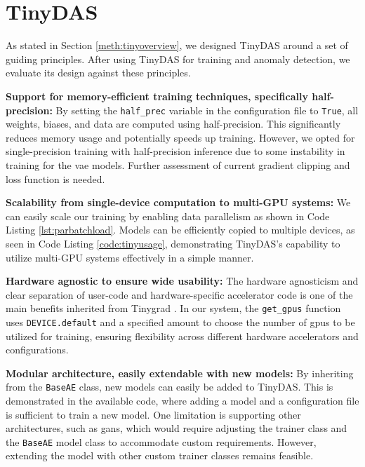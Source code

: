 \section{TinyDAS}
\label{disc:tinydas}

As stated in Section \ref{meth:tinyoverview}, we designed TinyDAS around a set of guiding principles. After using TinyDAS for training and anomaly detection, we evaluate its design against these principles.

\textbf{Support for memory-efficient training techniques, specifically half-precision:}
By setting the \lstinline|half_prec| variable in the configuration file to \lstinline|True|, all weights, biases, and data are computed using half-precision. This significantly reduces memory usage and potentially speeds up training. However, we opted for single-precision training with half-precision inference due to some instability in training for the \acrshort{vae} models. Further assessment of current gradient clipping and loss function is needed.

\textbf{Scalability from single-device computation to multi-GPU systems:}
We can easily scale our training by enabling data parallelism as shown in Code Listing \ref{lst:parbatchload}. Models can be efficiently copied to multiple devices, as seen in Code Listing \ref{code:tinyusage}, demonstrating TinyDAS's capability to utilize multi-GPU systems effectively in a simple manner.

\textbf{Hardware agnostic to ensure wide usability:}
The hardware agnosticism and clear separation of user-code and hardware-specific accelerator code is one of the main benefits inherited from Tinygrad \cite{tinygrad}. In our system, the \lstinline|get_gpus| function uses \lstinline|DEVICE.default| and a specified amount to choose the number of \acrshort{gpu}s to be utilized for training, ensuring flexibility across different hardware accelerators and configurations.

\textbf{Modular architecture, easily extendable with new models:}
By inheriting from the \lstinline|BaseAE| class, new models can easily be added to TinyDAS. This is demonstrated in the available code, where adding a model and a configuration file is sufficient to train a new model. One limitation is supporting other architectures, such as \acrshort{gan}s, which would require adjusting the trainer class and the \lstinline|BaseAE| model class to accommodate custom requirements. However, extending the model with other custom trainer classes remains feasible.

